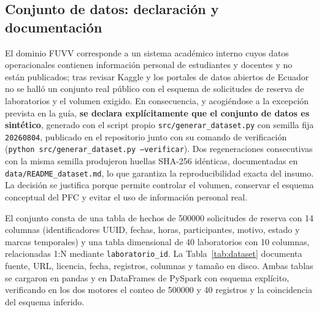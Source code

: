 \documentclass[10pt,journal]{IEEEtran}
\begin{document}
\subsection{Conjunto de datos: declaraci\'on y documentaci\'on}
\label{sec:dataset}
El dominio FUVV corresponde a un sistema acad\'emico interno cuyos datos
operacionales contienen informaci\'on personal de estudiantes y docentes y no
est\'an publicados; tras revisar Kaggle y los portales de datos abiertos de
Ecuador no se hall\'o un conjunto real p\'ublico con el esquema de solicitudes
de reserva de laboratorios y el volumen exigido. En consecuencia, y acogi\'endose
a la excepci\'on prevista en la gu\'ia, \textbf{se declara expl\'icitamente que
el conjunto de datos es sint\'etico}, generado con el script propio
\texttt{src/generar\_dataset.py} con semilla fija \texttt{20260804}, publicado
en el repositorio junto con su comando de verificaci\'on
(\texttt{python src/generar\_dataset.py --verificar}). Dos regeneraciones
consecutivas con la misma semilla produjeron huellas SHA-256 id\'enticas,
documentadas en \texttt{data/README\_dataset.md}, lo que garantiza la
reproducibilidad exacta del insumo. La decisi\'on se justifica porque permite
controlar el volumen, conservar el esquema conceptual del PFC y evitar el uso
de informaci\'on personal real.

El conjunto consta de una tabla de hechos de \num{500000} solicitudes de
reserva con 14 columnas (identificadores UUID, fechas, horas, participantes,
motivo, estado y marcas temporales) y una tabla dimensional de 40 laboratorios
con 10 columnas, relacionadas 1:N mediante \texttt{laboratorio\_id}. La
Tabla~\ref{tab:dataset} documenta fuente, URL, licencia, fecha, registros,
columnas y tama\~no en disco. Ambas tablas se cargaron en pandas y en DataFrames
de PySpark con esquema expl\'icito, verificando en los dos motores el conteo de
\num{500000} y \num{40} registros y la coincidencia del esquema inferido.
\end{document}
